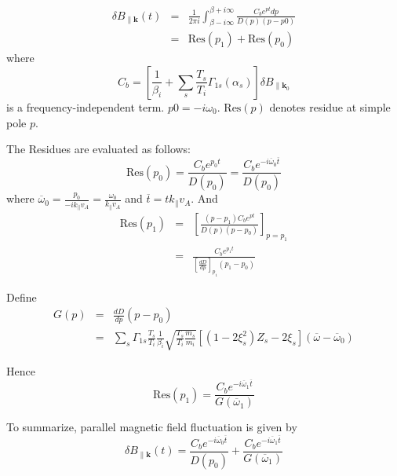 \documentclass[12pt]{article}
\begin{document}
\begin{eqnarray}
\delta B_{\parallel \mathbf{k}}(t) &=& \frac{1}{2\pi i} \int_{\beta - i\infty}^{\beta + i\infty} \frac{C_b e^{pt} dp}{D(p) (p-p0)} \\
&=& \mathrm{Res}(p_1) + \mathrm{Res}(p_0)
\end{eqnarray}
where 
\begin{equation}
C_b =  \left[\frac{1}{\beta_i} + \sum_s \frac{T_s}{T_i}\Gamma_{1s}(\alpha_s)\right] \delta B_{\parallel \mathbf{k}_0}
\end{equation}
 is a frequency-independent term. $p0=-i\omega_0$. $\mathrm{Res}(p)$ denotes residue at simple pole $p$. 

The Residues are evaluated as follows:
%
\begin{equation}
\mathrm{Res}(p_0) = \frac{C_b e^{p_0t}}{D(p_0)}  = \frac{C_b e^{-i\overline{\omega}_0\overline{t}}}{D(p_0)}
\end{equation}
where $\overline{\omega}_ 0 = \frac{p_0}{-i k_\parallel v_A} = \frac{\omega_0}{k_\parallel v_A}$ and $\overline{t} = t k_\parallel v_A$.
%
And 
\begin{eqnarray}
\mathrm{Res}(p_1) &=& \left[ \frac{(p-p_1) C_b e^{pt}}{D(p) (p-p_0)}\right]_{p=p_1} \\
&=& \frac{C_b e^{p_1t}}{\left[\frac{dD}{dp}\right]_{p_1} (p_1-p_0)}
\end{eqnarray}

Define
\begin{eqnarray}
G(p) &=& \frac{dD}{dp} (p-p_0)\\
&=& \sum_s \Gamma_{1s} \frac{T_s}{T_i} \frac{1}{\beta_i} \sqrt{\frac{T_s}{T_i}\frac{m_s}{m_i}} \left[(1- 2\xi_s^2)Z_s - 2\xi_s\right] (\overline{\omega} - \overline{\omega}_0)
\end{eqnarray}

Hence 
\begin{equation}
\mathrm{Res}(p_1) = \frac{C_b e^{-i \overline{\omega}_1 \overline{t}}}{G(\overline{\omega}_1)}
\end{equation}

To summarize, parallel magnetic field fluctuation is given by
\begin{equation}
\delta B_{\parallel \mathbf{k}}(t) = \frac{C_b e^{-i\overline{\omega}_0\overline{t}}}{D(p_0)} +  \frac{C_b e^{-i \overline{\omega}_1\overline{t}}}{G(\overline{\omega}_1)} 
\end{equation}
\end{document}
